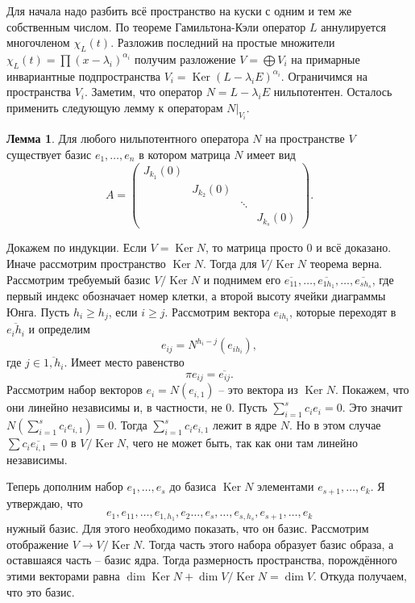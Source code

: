 \documentclass[10pt,a4paper,oneside]{book} %
\theoremstyle{definition}
\newtheorem{lem}{Лемма}
\newcommand{\ovl}{\overline}
\DeclareMathOperator{\Ker}{Ker}
\def\lm{\begin{lem}}
\def\elm{\end{lem}}
\begin{document}
\proof[Существование]


Для начала надо разбить всё пространство на куски с одним и тем же собственным числом. По теореме Гамильтона-Кэли оператор $L$ аннулируется многочленом $\chi_L(t)$. Разложив последний на простые множители $\chi_L(t)=\prod (x-\lambda_i)^{\alpha_i}$ получим разложение $V=\bigoplus V_i$ на примарные инвариантные подпространства $V_i=\Ker (L-\lambda_i E)^{\alpha_i}$. Ограничимся на пространства $V_i$. Заметим, что оператор $N=L-\lambda_i E$ нильпотентен. Осталось применить следующую  лемму к операторам $N|_{V_i}$.

\lm Для любого нильпотентного оператора $N$ на пространстве $V$ существует базис $e_1,\dots,e_n$ в котором матрица $N$ имеет вид
$$A=\begin{pmatrix}
J_{k_1}(0) &&&\\
& J_{k_2}(0) &&\\
&& \ddots& \\
&&& J_{k_s}(0)
\end{pmatrix}.
$$
\elm
\proof
Докажем по индукции. Если $V=\Ker N$, то матрица просто 0 и всё доказано. Иначе рассмотрим пространство $\Ker N$. Тогда для $V/\Ker N$ теорема верна. Рассмотрим требуемый базис $V/\Ker N$ и поднимем его $\ovl{e_{11}},\dots,\ovl{e_{1h_1}},\dots, \ovl{e_{sh_s}}$, где первый индекс обозначает номер клетки, а второй высоту ячейки диаграммы Юнга. Пусть $h_i\geq h_j$, если $i\geq j$.
Рассмотрим вектора $e_{ih_i}$, которые переходят в $\ovl{e_ih_i}$ и определим $$e_{ij}=N^{h_i-j}(e_{ih_i}),$$ где  $j\in \ovl{1,h_i}$. Имеет место равенство $$\pi{e_{ij}}=\ovl{e_{ij}}.$$
Рассмотрим набор векторов $e_i=N(e_{i,1})$ -- это вектора из $\Ker N$.
Покажем, что они линейно независимы и, в частности, не 0. Пусть $\sum_{i=1}^s c_ie_i=0$. Это значит $N(\sum_{i=1}^s c_i e_{i,1} )=0$. Тогда $\sum_{i=1}^s c_i e_{i,1} $ лежит в ядре $N$. Но в этом случае $\sum c_i \ovl{e_{i,1}}=0$ в $V/\Ker N$, чего не может быть, так как они там линейно независимы.

Теперь дополним набор $e_1,\dots,e_s$ до базиса $\Ker N$  элементами $e_{s+1},\dots,e_k$. Я утверждаю, что $$e_1, e_{11},\dots, e_{1,h_1},e_2\dots, e_s, \dots, e_{s,h_s}, e_{s+1},\dots, e_k$$
нужный базис. Для этого необходимо показать, что он базис. Рассмотрим отображение $V \to V/\Ker N$. Тогда часть этого набора образует базис образа, а оставшаяся часть -- базис ядра. Тогда размерность пространства, порождённого этими векторами равна $\dim \Ker N + \dim V/\Ker N = \dim V$. Откуда получаем, что это базис.
\endproof
\end{document}
